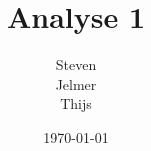 \documentclass{article}
\title{Analyse 1}
\author{Steven\\Jelmer\\Thijs}
\date{\today}
\begin{document}
\maketitle
\begin{multicols}{2}




\end{multicols}
\end{document}

